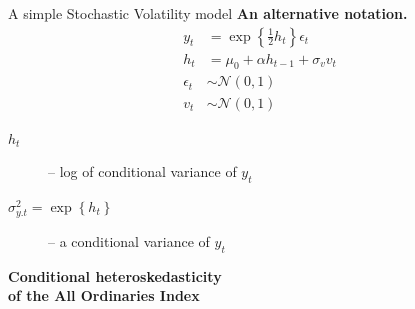 \documentclass[notes,blackandwhite,mathsans,usenames,dvipsnames]{beamer}
\begin{document}
\begin{frame}{A simple Stochastic Volatility model}
\textbf{An alternative notation.	}
\begin{align*}
y_t &= \exp\left\{\frac{1}{2}h_t\right\} \epsilon_t\\[1ex]
h_t &= \mu_0 + \alpha h_{t-1} + \sigma_v v_t\\[1ex]
\epsilon_t &\sim\mathcal{N}(0,1)\\[1ex]
v_t &\sim\mathcal{N}(0,1)
\end{align*}

\bigskip\begin{description}
\item[$h_t$] {\color{mcxs2}-- log of conditional variance of} $y_t$
\item[$\sigma_{y.t}^2 = \exp\left\{h_t\right\}$] {\color{mcxs2}-- a conditional variance of} $y_t$
\end{description}
\end{frame}





{
\begin{frame}


\begin{adjustwidth}{-0.5cm}{0cm}
\vspace{7.8cm}\Large
\textbf{{\color{mcxs2}Conditional heteroskedasticity}\\ {\color{purple}of the All Ordinaries Index} }
\end{adjustwidth}

\end{frame}
}
\end{document}
